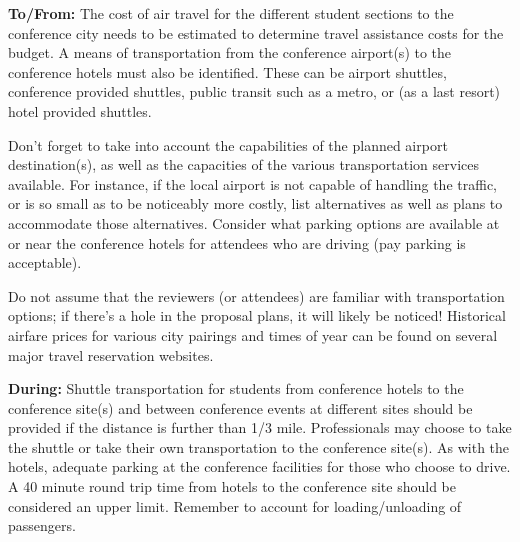 \documentclass[12pt]{article}
\begin{document}
\textbf{To/From:} The cost of air travel for the different student sections to the conference city needs to be estimated to determine travel assistance costs for the budget. A means of transportation from the conference airport(s) to the conference hotels must also be identified. These can be airport shuttles, conference provided shuttles, public transit such as a metro, or (as a last resort) hotel provided shuttles.

Don't forget to take into account the capabilities of the planned airport destination(s), as well as the capacities of the various transportation services available. For instance, if the local airport is not capable of handling the traffic, or is so small as to be noticeably more costly, list alternatives as well as plans to accommodate those alternatives. Consider what parking options are available at or near the conference hotels for attendees who are driving (pay parking is acceptable).

Do not assume that the reviewers (or attendees) are familiar with transportation options; if there's a hole in the proposal plans, it will likely be noticed! Historical airfare prices for various city pairings and times of year can be found on several major travel reservation websites.

\textbf{During:} Shuttle transportation for students from conference hotels to the conference site(s) and between conference events at different sites should be provided if the distance is further than 1/3 mile. Professionals may choose to take the shuttle or take their own transportation to the conference site(s). As with the hotels, adequate parking at the conference facilities for those who choose to drive. A 40 minute round trip time from hotels to the conference site should be considered an upper limit. Remember to account for loading/unloading of passengers.
\end{document}

